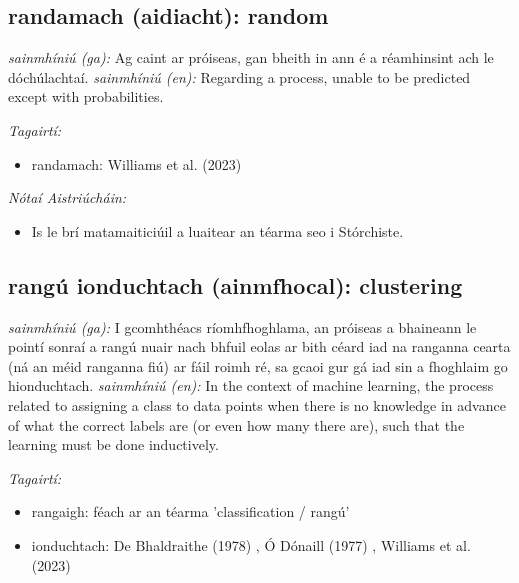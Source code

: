 \documentclass{article}
\begin{document}
\subsection*{randamach (aidiacht): random} 
 \noindent \textit{sainmhíniú (ga):} Ag caint ar próiseas, gan bheith in ann é a réamhinsint ach le dóchúlachtaí.
\newline\newline
 \noindent \textit{sainmhíniú (en):} Regarding a process, unable to be predicted except with probabilities.
\newline

 \noindent \textit{Tagairtí:}
\begin{itemize}
	\item randamach: Williams et al. (2023) \cite{storchiste}
\end{itemize}

 \noindent \textit{Nótaí Aistriúcháin:}
\begin{itemize}
	\item Is le brí matamaiticiúil a luaitear an téarma seo i Stórchiste.
\end{itemize}


\subsection*{rangú ionduchtach (ainmfhocal): clustering} 
 \noindent \textit{sainmhíniú (ga):} I gcomhthéacs ríomhfhoghlama, an próiseas a bhaineann le pointí sonraí a rangú nuair nach bhfuil eolas ar bith céard iad na ranganna cearta (ná an méid ranganna fiú) ar fáil roimh ré, sa gcaoi gur gá iad sin a fhoghlaim go hionduchtach.
\newline\newline
 \noindent \textit{sainmhíniú (en):} In the context of machine learning, the process related to assigning a class to data points when there is no knowledge in advance of what the correct labels are (or even how many there are), such that the learning must be done inductively.
\newline

 \noindent \textit{Tagairtí:}
\begin{itemize}
	\item rangaigh: féach ar an téarma 'classification / rangú'
	\item ionduchtach: De Bhaldraithe (1978) \cite{de-bhaldraithe}, Ó Dónaill (1977) \cite{odonaill}, Williams et al. (2023) \cite{storchiste}
\end{itemize}
\end{document}
